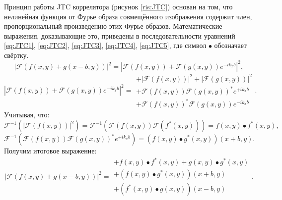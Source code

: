 Принцип работы JTC коррелятора (рисунок \ref{ris:JTC}) основан на том, что нелинейная функция от Фурье образа совмещённого изображения содержит член, пропорциональный произведению этих Фурье образов. Математические выражения, доказывающие это, приведены в последовательности уравнений \ref{eq:JTC1}, \ref{eq:JTC2}, \ref{eq:JTC3}, \ref{eq:JTC4}, \ref{eq:JTC5}, где символ $\bullet$ обозначает свёртку.
\begin{equation}\label{eq:JTC1}
	\left|\mathcal{F}\left(f(x,y) + g(x-b,y)\right)\right|^2 
	=
	\left|\mathcal{F}\left(f(x,y)\right) + \mathcal{F}\left(g(x,y)\right)e^{-ik_xb}\right|^2,
\end{equation}
\begin{equation}\label{eq:JTC2}
	\left|\mathcal{F}\left(f(x,y)\right) + \mathcal{F}\left(g(x,y)\right)e^{-ik_xb}\right|^2
	=
	\begin{matrix}
		+ \left|\mathcal{F}\left(f(x,y)\right)\right|^2 + \left|\mathcal{F}\left(g(x,y)\right)\right|^2 \\
		+ \mathcal{F}\left(f(x,y)\right)\mathcal{F}\left(g(x,y)\right)^*e^{+ik_xb} \\
		+ \mathcal{F}\left(f(x,y)\right)^*\mathcal{F}\left(g(x,y)\right)e^{-ik_xb}
	\end{matrix}.
\end{equation}
Учитывая, что:
\begin{equation}\label{eq:JTC3}
	\mathcal{F}^{-1}\left(
	\left|\mathcal{F}\left(f(x,y)\right)\right|^2
	\right)
	=
	\mathcal{F}^{-1}\left(
	\mathcal{F}\left(f(x,y)\right)\mathcal{F}\left(f^*(x,y)\right)
	\right)
	=
	f(x,y) \bullet f^*(x,y),
\end{equation}
\begin{equation}\label{eq:JTC4}
	\mathcal{F}^{-1}\left(
	\mathcal{F}\left(f(x,y)\right)\mathcal{F}\left(g(x,y)\right)^*e^{+ik_xb}
	\right)
	=
	(f(x,y) \bullet g^*(x,y))(x+b,y).
\end{equation}
Получим итоговое выражение:
\begin{equation}\label{eq:JTC5}
	\left|\mathcal{F}\left(f(x,y) + g(x-b,y)\right)\right|^2 
	=
	\begin{matrix}
		+ f(x,y) \bullet f^*(x,y) + g(x,y) \bullet g^*(x,y) \\
		+ (f(x,y) \bullet g^*(x,y))(x+b,y) \\
		+ (f^*(x,y) \bullet g(x,y))(x-b,y)
	\end{matrix}.
\end{equation}





